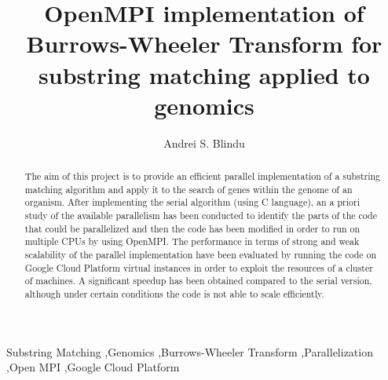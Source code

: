 \documentclass[final,5p,times,twocolumn,authoryear]{elsarticle}
\begin{document}
\begin{frontmatter}

\title{OpenMPI implementation of Burrows-Wheeler Transform for substring matching applied to genomics}

\author{Andrei S. Blindu}

\begin{abstract}
The aim of this project is to provide an efficient parallel implementation of a substring matching algorithm and apply it to the search of genes within the genome of an organism. After implementing the serial algorithm (using C language), an a priori study of the available parallelism has been conducted to identify the parts of the code that could be parallelized and then the code has been modified in order to run on multiple CPUs by using OpenMPI. The performance in terms of strong and weak scalability of the parallel implementation have been evaluated by running the code on Google Cloud Platform virtual instances in order to exploit the resources of a cluster of machines. A significant speedup has been obtained compared to the serial version, although under certain conditions the code is not able to scale efficiently.
\end{abstract}

\begin{keyword}
Substring Matching \sep Genomics \sep Burrows-Wheeler Transform \sep Parallelization \sep Open MPI \sep Google Cloud Platform
\end{keyword}

\end{frontmatter}

\tableofcontents

\vspace{\baselineskip}

\end{document}
